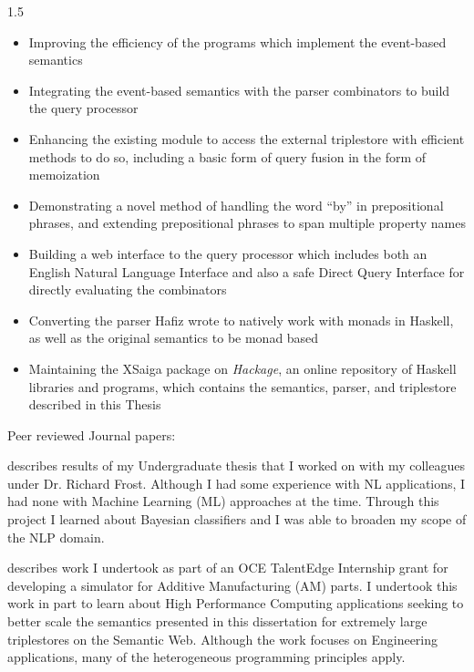 \documentclass[fleqn, oneside, 12pt]{book}
\theoremstyle{definitionsty}
\newcommand{\uwinonehalfspacelen}{1.5}
\newcommand{\uwindefaultspacelen}{\uwinonehalfspacelen}
\newenvironment{uwindefaultspaceenv}%
{\begin{spacing}{\uwindefaultspacelen}}%
	{\end{spacing}}
\begin{document}
\begin{uwindefaultspaceenv}
\begin{itemize}
	\item Improving the efficiency of the programs which implement the event-based semantics
	\item Integrating the event-based semantics with the parser combinators to build the query processor
	\item Enhancing the existing module to access the external triplestore with efficient methods to do so, including a basic form of query fusion in the form of memoization
	\item Demonstrating a novel method of handling the word ``by'' in prepositional phrases, and extending prepositional phrases to span multiple property names
	\item Building a web interface to the query processor which includes both an English Natural Language Interface and also a safe Direct Query Interface for directly evaluating the combinators
	\item Converting the parser Hafiz wrote\cite{frosthafiz2008} to natively work with monads in Haskell, as well as the original semantics\cite{frost2014demonstration} to be monad based
	\item Maintaining the XSaiga package on {\em Hackage}\cite{xsaiga}, an online repository of Haskell libraries and programs, which contains the semantics, parser, and triplestore described in this Thesis
\end{itemize}

Peer reviewed Journal papers:

\cite{peelar2019real} 

\cite{peelar2020webistjournal} 

\cite {donais2013system} describes results of my Undergraduate thesis that I worked on with my colleagues under Dr. Richard Frost.  Although I had some experience with NL applications, I had none with Machine Learning (ML) approaches at the time.  Through this project I learned about Bayesian classifiers and I was able to broaden my scope of the NLP domain.

\cite {peelar2017windsor,peelar2018toolpath,peelar2019real} describes work I undertook as part of an OCE TalentEdge Internship grant for developing a simulator for Additive Manufacturing (AM) parts.  I undertook this work in part to learn about High Performance Computing applications seeking to better scale the semantics presented in this dissertation for extremely large triplestores on the Semantic Web.  Although the work focuses on Engineering applications, many of the heterogeneous programming principles apply.


\end{uwindefaultspaceenv}
\end{document}
